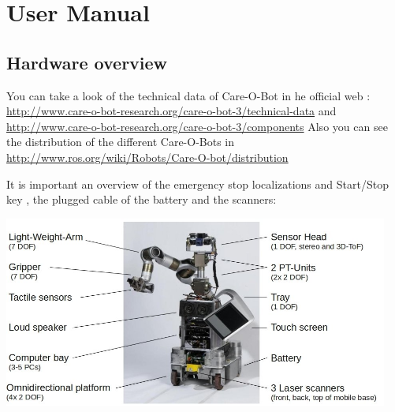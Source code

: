 \chapter{User Manual}
     
\section{Hardware overview}
You can take a look of the technical data of Care-O-Bot in he official web : \url{http://www.care-o-bot-research.org/care-o-bot-3/technical-data} and \url{http://www.care-o-bot-research.org/care-o-bot-3/components}
Also you can see the distribution of the different Care-O-Bots in 
\\ \url{http://www.ros.org/wiki/Robots/Care-O-bot/distribution}

It is important an overview of the emergency stop localizations and Start/Stop key , the plugged cable of the battery and the scanners: 
\begin{center}
 \includegraphics[width=0.95\textwidth]{images/hardware_overview.jpg}
 \end{center}


